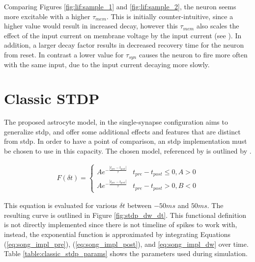 

Comparing Figures \ref{fig:lif:sample_1} and \ref{fig:lif:sample_2}, the
neuron seems more excitable with a higher $\tau_{mem}$. This is initially
counter-intuitive, since a higher value would result in increased decay,
however this $\tau_{mem}$ also scales the effect of the input current on
membrane voltage by the input current (see ). In
addition, a larger decay factor results in decreased recovery time for the
neuron from reset. In contrast a lower value for $\tau_{syn}$ causes the
neuron to fire more often with the same input, due to the input current
decaying more slowly.

\section{Classic STDP} \label{obj1:sec:classic_stdp}
    
The proposed astrocyte model, in the single-synapse configuration aims to
generalize \gls{stdp}, and offer some additional effects and features that are
distinct from \gls{stdp}. In order to have a point of comparison, an \gls{stdp}
implementation must be chosen to use in this capacity. The chosen model,
referenced by \parencite{song_2000} is outlined by .

\begin{align}
  F(\delta t) =
  \begin{cases} 
    Ae^{- \frac{|t_{pre}-t_{post}|}{\tau}} & t_{pre} - t_{post} \leq 0, A > 0
    \\ Ae^{- \frac{|t_{pre}-t_{post}|}{\tau}} & t_{pre} - t_{post} > 0, B < 0
  \end{cases} \label{eq:song_classic_stdp}
\end{align}

This equation is evaluated for various $\delta t$ between $-50ms$ and
$50ms$. The resulting curve is outlined in Figure \ref{fig:stdp_dw_dt}. This
functional definition is not directly implemented since there is not timeline of
spikes to work with, instead, the exponential function is approximated by
integrating Equations (\ref{eq:song_impl_pre}), (\ref{eq:song_impl_post}), and
\ref{eq:song_impl_dw} over time. Table \ref{table:classic_stdp_params} shows the
parameters used during simulation.

